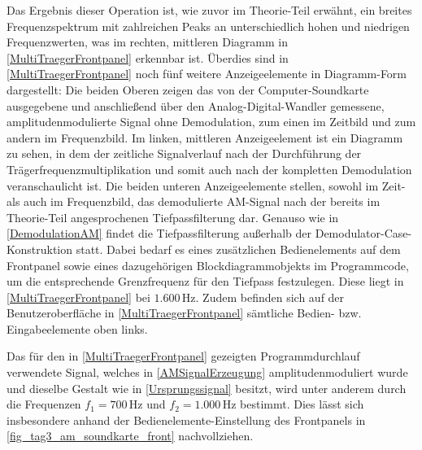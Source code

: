 \documentclass[
a4paper,
12pt,
pagesize,
ngerman
]{scrartcl}
\begin{document}
	\noindent Das Ergebnis dieser Operation ist, wie zuvor im Theorie-Teil erwähnt, ein breites Frequenzspektrum mit zahlreichen Peaks an unterschiedlich hohen und niedrigen Frequenzwerten, was im rechten, mittleren Diagramm in \cref{MultiTraegerFrontpanel} erkennbar ist. 
	Überdies sind in \cref{MultiTraegerFrontpanel} noch fünf weitere Anzeigeelemente in Diagramm-Form dargestellt: Die beiden Oberen zeigen das von der Computer-Soundkarte ausgegebene und anschließend über den Analog-Digital-Wandler gemessene, amplitudenmodulierte Signal ohne Demodulation, zum einen im Zeitbild und zum andern im Frequenzbild. %
	Im linken, mittleren Anzeigeelement ist ein Diagramm zu sehen, in dem der zeitliche Signalverlauf nach der Durchführung der Trägerfrequenzmultiplikation und somit auch nach der kompletten Demodulation veranschaulicht ist. 
	Die beiden unteren Anzeigeelemente stellen, sowohl im Zeit- als auch im Frequenzbild, das demodulierte AM-Signal nach der bereits im Theorie-Teil angesprochenen Tiefpassfilterung dar. 
	Genauso wie in \cref{DemodulationAM} findet die Tiefpassfilterung außerhalb der Demodulator-Case-Konstruktion statt. 
	Dabei bedarf es eines zusätzlichen Bedienelements auf dem Frontpanel sowie eines dazugehörigen Blockdiagrammobjekts im Programmcode, um die entsprechende Grenzfrequenz für den Tiefpass festzulegen. 
	Diese liegt in \cref{MultiTraegerFrontpanel} bei $1.600\,$Hz. 
	Zudem befinden sich auf der Benutzeroberfläche in \cref{MultiTraegerFrontpanel} sämtliche Bedien- bzw. Eingabeelemente oben links.
	
	Das für den in \cref{MultiTraegerFrontpanel} gezeigten Programmdurchlauf verwendete Signal, welches in \cref{AMSignalErzeugung} amplitudenmoduliert wurde und dieselbe Gestalt wie in \cref{Ursprungssignal} besitzt, wird unter anderem durch die Frequenzen $f_1 = 700\,$Hz und $f_2 = 1.000\,$Hz bestimmt. 
	Dies lässt sich insbesondere anhand der Bedienelemente-Einstellung des Frontpanels in \cref{fig_tag3_am_soundkarte_front} nachvollziehen. 
				
\end{document}
